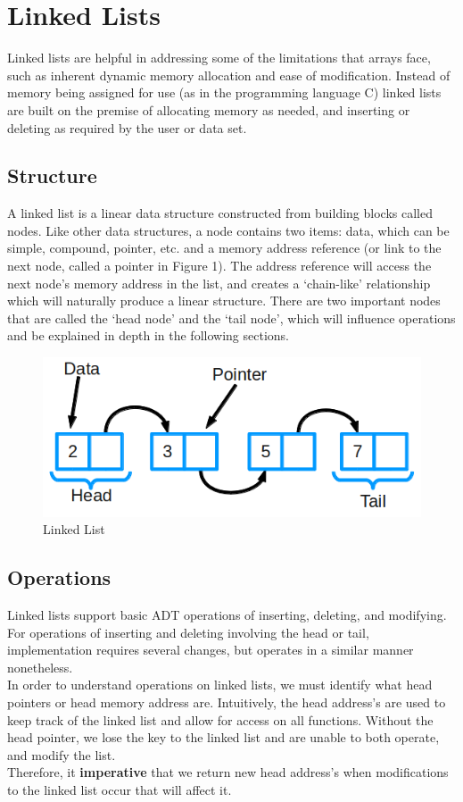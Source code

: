 \documentclass[hidelinks,11pt]{article}
\begin{document}
\section{Linked Lists}
Linked lists are helpful in addressing some of the limitations that arrays face, such as inherent dynamic memory allocation and ease of modification. Instead of memory being assigned for use (as in the programming language C) linked lists are built on the premise of allocating memory as needed, and inserting or deleting as required by the user or data set.
\subsection{Structure}
A linked list is a linear data structure constructed from building blocks called nodes. Like other data structures, a node contains two items: data, which can be simple, compound, pointer, etc. and a memory address reference (or link to the next node, called a pointer in Figure 1). The address reference will access the next node's memory address in the list, and creates a `chain-like' relationship which will naturally produce a linear structure. There are two important nodes that are called the `head node' and the `tail node', which will influence operations and be explained in depth in the following sections.
\begin{figure}[h!]
    \centering
    \includegraphics[scale=0.35]{linkedlist.png}
    \caption{Linked List}
\end{figure}
\subsection{Operations}
Linked lists support basic ADT operations of inserting, deleting, and modifying. For operations of inserting and deleting involving the head or tail, implementation requires several changes, but operates in a similar manner nonetheless.\\[0.5\baselineskip]
In order to understand operations on linked lists, we must identify what head pointers or head memory address are. Intuitively, the head address's are used to keep track of the linked list and allow for access on all functions. Without the head pointer, we lose the key to the linked list and are unable to both operate, and modify the list.\\[0.5\baselineskip] Therefore, it \textbf{imperative} that we return new head address's when modifications to the linked list occur that will affect it.
\end{document}
